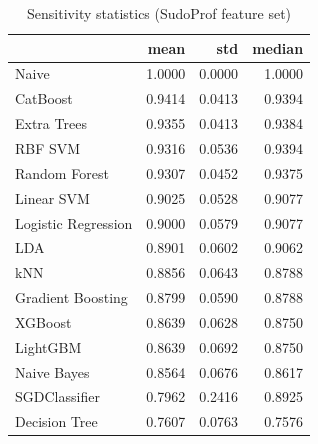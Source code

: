 \begin{table}
\caption{Sensitivity statistics (SudoProf feature set)}
\label{tab:sensitivity_SudoProf_stats}
\begin{tabular}{lrrr}
\toprule
 & mean & std & median \\
\midrule
Naive & 1.0000 & 0.0000 & 1.0000 \\
CatBoost & 0.9414 & 0.0413 & 0.9394 \\
Extra Trees & 0.9355 & 0.0413 & 0.9384 \\
RBF SVM & 0.9316 & 0.0536 & 0.9394 \\
Random Forest & 0.9307 & 0.0452 & 0.9375 \\
Linear SVM & 0.9025 & 0.0528 & 0.9077 \\
Logistic Regression & 0.9000 & 0.0579 & 0.9077 \\
LDA & 0.8901 & 0.0602 & 0.9062 \\
kNN & 0.8856 & 0.0643 & 0.8788 \\
Gradient Boosting & 0.8799 & 0.0590 & 0.8788 \\
XGBoost & 0.8639 & 0.0628 & 0.8750 \\
LightGBM & 0.8639 & 0.0692 & 0.8750 \\
Naive Bayes & 0.8564 & 0.0676 & 0.8617 \\
SGDClassifier & 0.7962 & 0.2416 & 0.8925 \\
Decision Tree & 0.7607 & 0.0763 & 0.7576 \\
\bottomrule
\end{tabular}
\end{table}

